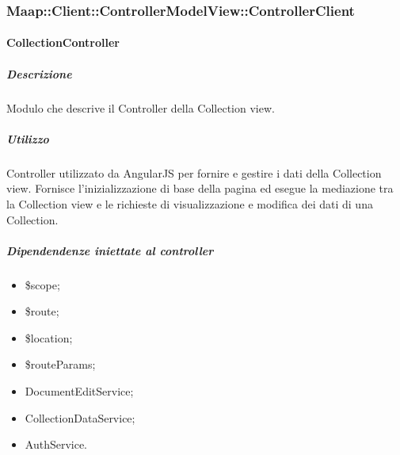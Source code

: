 \subsubsection{Maap::Client::ControllerModelView::ControllerClient}

\paragraph{CollectionController}
\subparagraph{Descrizione}
Modulo che descrive il Controller della Collection view.

\subparagraph{Utilizzo}
Controller utilizzato da AngularJS per fornire e gestire i dati della Collection view.
Fornisce l'inizializzazione di base della pagina ed esegue la mediazione tra la Collection view
e le richieste di visualizzazione e modifica dei dati di una Collection.

\subparagraph{Dipendendenze iniettate al controller}
\begin{itemize}
 \item \$scope;
 \item \$route;
 \item \$location;
 \item \$routeParams;
 \item DocumentEditService;
 \item CollectionDataService;
 \item AuthService.
\end{itemize}

